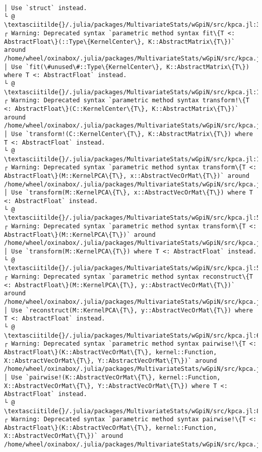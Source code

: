 \documentclass[11pt]{article}
\begin{document}
\begin{Verbatim}[commandchars=\\\{\}]
│ Use `struct` instead.
└ @ \textasciitilde{}/.julia/packages/MultivariateStats/wGpiN/src/kpca.jl:30
┌ Warning: Deprecated syntax `parametric method syntax fit\{T <: AbstractFloat\}(::Type\{KernelCenter\}, K::AbstractMatrix\{T\})` around /home/wheel/oxinabox/.julia/packages/MultivariateStats/wGpiN/src/kpca.jl:11.
│ Use `fit(\#unused\#::Type\{KernelCenter\}, K::AbstractMatrix\{T\}) where T <: AbstractFloat` instead.
└ @ \textasciitilde{}/.julia/packages/MultivariateStats/wGpiN/src/kpca.jl:11
┌ Warning: Deprecated syntax `parametric method syntax transform!\{T <: AbstractFloat\}(C::KernelCenter\{T\}, K::AbstractMatrix\{T\})` around /home/wheel/oxinabox/.julia/packages/MultivariateStats/wGpiN/src/kpca.jl:18.
│ Use `transform!(C::KernelCenter\{T\}, K::AbstractMatrix\{T\}) where T <: AbstractFloat` instead.
└ @ \textasciitilde{}/.julia/packages/MultivariateStats/wGpiN/src/kpca.jl:18
┌ Warning: Deprecated syntax `parametric method syntax transform\{T <: AbstractFloat\}(M::KernelPCA\{T\}, x::AbstractVecOrMat\{T\})` around /home/wheel/oxinabox/.julia/packages/MultivariateStats/wGpiN/src/kpca.jl:51.
│ Use `transform(M::KernelPCA\{T\}, x::AbstractVecOrMat\{T\}) where T <: AbstractFloat` instead.
└ @ \textasciitilde{}/.julia/packages/MultivariateStats/wGpiN/src/kpca.jl:51
┌ Warning: Deprecated syntax `parametric method syntax transform\{T <: AbstractFloat\}(M::KernelPCA\{T\})` around /home/wheel/oxinabox/.julia/packages/MultivariateStats/wGpiN/src/kpca.jl:57.
│ Use `transform(M::KernelPCA\{T\}) where T <: AbstractFloat` instead.
└ @ \textasciitilde{}/.julia/packages/MultivariateStats/wGpiN/src/kpca.jl:57
┌ Warning: Deprecated syntax `parametric method syntax reconstruct\{T <: AbstractFloat\}(M::KernelPCA\{T\}, y::AbstractVecOrMat\{T\})` around /home/wheel/oxinabox/.julia/packages/MultivariateStats/wGpiN/src/kpca.jl:62.
│ Use `reconstruct(M::KernelPCA\{T\}, y::AbstractVecOrMat\{T\}) where T <: AbstractFloat` instead.
└ @ \textasciitilde{}/.julia/packages/MultivariateStats/wGpiN/src/kpca.jl:62
┌ Warning: Deprecated syntax `parametric method syntax pairwise!\{T <: AbstractFloat\}(K::AbstractVecOrMat\{T\}, kernel::Function, X::AbstractVecOrMat\{T\}, Y::AbstractVecOrMat\{T\})` around /home/wheel/oxinabox/.julia/packages/MultivariateStats/wGpiN/src/kpca.jl:80.
│ Use `pairwise!(K::AbstractVecOrMat\{T\}, kernel::Function, X::AbstractVecOrMat\{T\}, Y::AbstractVecOrMat\{T\}) where T <: AbstractFloat` instead.
└ @ \textasciitilde{}/.julia/packages/MultivariateStats/wGpiN/src/kpca.jl:80
┌ Warning: Deprecated syntax `parametric method syntax pairwise!\{T <: AbstractFloat\}(K::AbstractVecOrMat\{T\}, kernel::Function, X::AbstractVecOrMat\{T\})` around /home/wheel/oxinabox/.julia/packages/MultivariateStats/wGpiN/src/kpca.jl:94.

\end{Verbatim}
\end{document}
